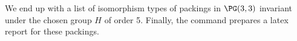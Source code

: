 


We end up with a list of isomorphism types of packings in $\PG(3,3)$ 
invariant under the chosen group $H$ of order 5.
Finally, the command prepares a latex report for these packings.






\bigskip








